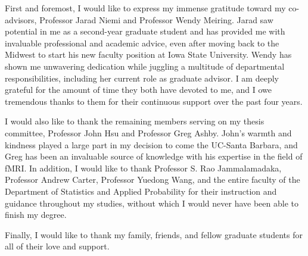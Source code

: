   \approvalpage
  \copyrightpage

  \begin{acknowledgements}

  First and foremost, I would like to express my immense gratitude toward my co-advisors, Professor Jarad Niemi and Professor Wendy Meiring. Jarad saw potential in me as a second-year graduate student and has provided me with invaluable professional and academic advice, even after moving back to the Midwest to start his new faculty position at Iowa State University. Wendy has shown me unwavering dedication while juggling a multitude of departmental responsibilities, including her current role as graduate advisor. I am deeply grateful for the amount of time they both have devoted to me, and I owe tremendous thanks to them for their continuous support over the past four years.

  I would also like to thank the remaining members serving on my thesis committee, Professor John Hsu and Professor Greg Ashby. John's warmth and kindness played a large part in my decision to come the UC-Santa Barbara, and Greg has been an invaluable source of knowledge with his expertise in the field of fMRI. In addition, I would like to thank Professor S. Rao Jammalamadaka, Professor Andrew Carter, Professor Yuedong Wang, and the entire faculty of the Department of Statistics and Applied Probability for their instruction and guidance throughout my studies, without which I would never have been able to finish my degree.

  Finally, I would like to thank my family, friends, and fellow graduate students for all of their love and support.

  \end{acknowledgements}
\ssp

